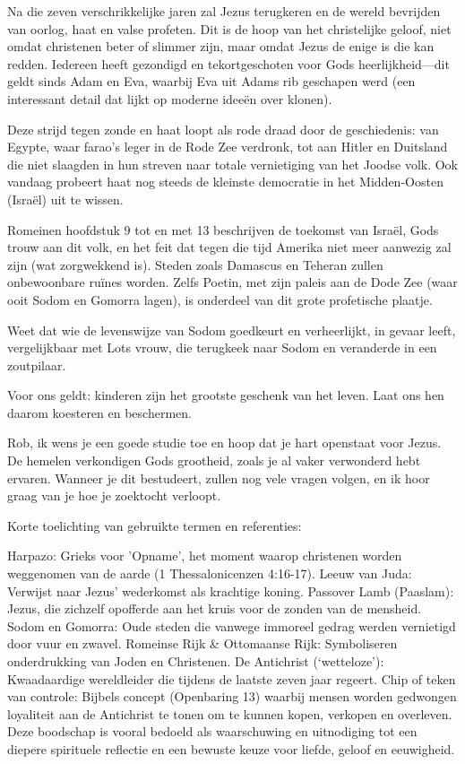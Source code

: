 Na die zeven verschrikkelijke jaren zal Jezus terugkeren en de wereld bevrijden van oorlog, haat en valse profeten. Dit is de hoop van het christelijke geloof, niet omdat christenen beter of slimmer zijn, maar omdat Jezus de enige is die kan redden. Iedereen heeft gezondigd en tekortgeschoten voor Gods heerlijkheid—dit geldt sinds Adam en Eva, waarbij Eva uit Adams rib geschapen werd (een interessant detail dat lijkt op moderne ideeën over klonen).

Deze strijd tegen zonde en haat loopt als rode draad door de geschiedenis: van Egypte, waar farao’s leger in de Rode Zee verdronk, tot aan Hitler en Duitsland die niet slaagden in hun streven naar totale vernietiging van het Joodse volk. Ook vandaag probeert haat nog steeds de kleinste democratie in het Midden-Oosten (Israël) uit te wissen.

Romeinen hoofdstuk 9 tot en met 13 beschrijven de toekomst van Israël, Gods trouw aan dit volk, en het feit dat tegen die tijd Amerika niet meer aanwezig zal zijn (wat zorgwekkend is). Steden zoals Damascus en Teheran zullen onbewoonbare ruïnes worden. Zelfs Poetin, met zijn paleis aan de Dode Zee (waar ooit Sodom en Gomorra lagen), is onderdeel van dit grote profetische plaatje.

Weet dat wie de levenswijze van Sodom goedkeurt en verheerlijkt, in gevaar leeft, vergelijkbaar met Lots vrouw, die terugkeek naar Sodom en veranderde in een zoutpilaar.

Voor ons geldt: kinderen zijn het grootste geschenk van het leven. Laat ons hen daarom koesteren en beschermen.

Rob, ik wens je een goede studie toe en hoop dat je hart openstaat voor Jezus. De hemelen verkondigen Gods grootheid, zoals je al vaker verwonderd hebt ervaren. Wanneer je dit bestudeert, zullen nog vele vragen volgen, en ik hoor graag van je hoe je zoektocht verloopt.

Korte toelichting van gebruikte termen en referenties:

Harpazo: Grieks voor 'Opname', het moment waarop christenen worden weggenomen van de aarde (1 Thessalonicenzen 4:16-17).
Leeuw van Juda: Verwijst naar Jezus’ wederkomst als krachtige koning.
Passover Lamb (Paaslam): Jezus, die zichzelf opofferde aan het kruis voor de zonden van de mensheid.
Sodom en Gomorra: Oude steden die vanwege immoreel gedrag werden vernietigd door vuur en zwavel.
Romeinse Rijk \& Ottomaanse Rijk: Symboliseren onderdrukking van Joden en Christenen.
De Antichrist (‘wetteloze’): Kwaadaardige wereldleider die tijdens de laatste zeven jaar regeert.
Chip of teken van controle: Bijbels concept (Openbaring 13) waarbij mensen worden gedwongen loyaliteit aan de Antichrist te tonen om te kunnen kopen, verkopen en overleven.
Deze boodschap is vooral bedoeld als waarschuwing en uitnodiging tot een diepere spirituele reflectie en een bewuste keuze voor liefde, geloof en eeuwigheid.

